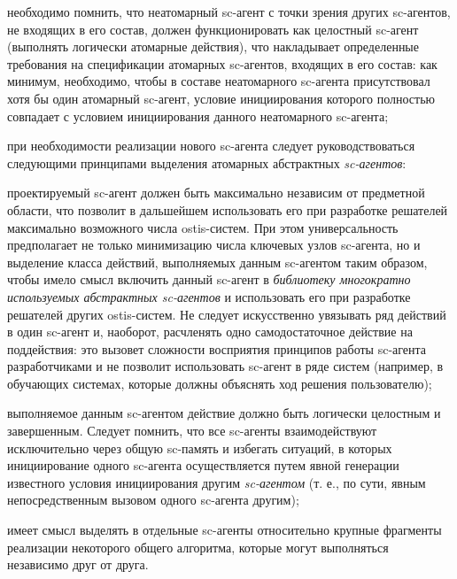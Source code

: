 \begin{textitemize}
\item необходимо помнить, что неатомарный sc-агент с точки зрения других sc-агентов, не входящих в его состав, должен функционировать как целостный sc-агент (выполнять логически атомарные действия), что накладывает определенные требования на спецификации атомарных sc-агентов, входящих в его состав: как минимум, необходимо, чтобы в составе неатомарного sc-агента присутствовал хотя бы один атомарный sc-агент, условие инициирования которого полностью совпадает с условием инициирования данного неатомарного sc-агента;
\item при необходимости реализации нового sc-агента следует руководствоваться следующими принципами выделения атомарных абстрактных \textit{sc-агентов}:

\begin{textitemize}
    \item проектируемый sc-агент должен быть максимально независим от предметной области, что позволит в дальшейшем использовать его при разработке решателей максимально возможного числа ostis-систем. При этом универсальность предполагает не только минимизацию числа ключевых узлов sc-агента, но и выделение класса действий, выполняемых данным sc-агентом таким образом, чтобы имело смысл включить данный sc-агент в \textit{библиотеку многократно используемых абстрактных sc-агентов} и использовать его при разработке решателей других ostis-систем. Не следует искусственно увязывать ряд действий в один sc-агент и, наоборот, расчленять одно самодостаточное действие на поддействия: это вызовет сложности восприятия принципов работы sc-агента разработчиками и не позволит использовать sc-агент в ряде систем (например, в обучающих системах, которые должны объяснять ход решения пользователю);
    \item выполняемое данным sc-агентом действие должно быть логически целостным и завершенным. Следует помнить, что все sc-агенты взаимодействуют исключительно через общую sc-память и избегать ситуаций, в которых инициирование одного sc-агента осуществляется путем явной генерации известного условия инициирования другим \textit{sc-агентом} (т. е., по сути, явным непосредственным вызовом одного sc-агента другим);
    \item имеет смысл выделять в отдельные sc-агенты относительно крупные фрагменты реализации некоторого общего алгоритма, которые могут выполняться независимо друг от друга.
\end{textitemize}


\end{textitemize}
